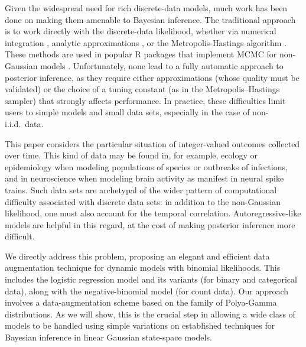 Given the widespread need for rich discrete-data models, much work has been done
on making them amenable to Bayesian inference.  The traditional approach is to
work directly with the discrete-data likelihood, whether via numerical
integration \citep{skene-wakefield-1990}, analytic approximations
\citep{carlin-1992,bradlow-etal-2002,gelman-etal-2008,forster-2011}, or the
Metropolis-Hastings algorithm \citep{dellaportas-forster-1999,
  dobra-tebaldi-west-2006}.  These methods are used in popular R packages that
implement MCMC for non-Gaussian models \citep{mcmcpack-2011}.  Unfortunately,
none lead to a fully automatic approach to posterior inference, as they require
either approximations (whose quality must be validated) or the choice of a
tuning constant (as in the Metropolis--Hastings sampler) that strongly affects
performance.  In practice, these difficulties limit users to simple models and
small data sets, especially in the case of non-i.i.d.~data.

This paper considers the particular situation of integer-valued outcomes
collected over time.  This kind of data may be found in, for example, ecology or
epidemiology when modeling populations of species or outbreaks of infections,
and in neuroscience when modeling brain activity as manifest in neural spike
trains.  Such data sets are archetypal of the wider pattern of computational
difficulty associated with discrete data sets: in addition to the non-Gaussian
likelihood, one must also account for the temporal correlation.
Autoregressive-like models are helpful in this regard, at the cost of making
posterior inference more difficult.

We directly address this problem, proposing an elegant and efficient data
augmentation technique for dynamic models with binomial likelihoods.  This
includes the logistic regression model and its variants (for binary and
categorical data), along with the negative-binomial model (for count data).  Our
approach involves a data-augmentation scheme based on the family of Polya-Gamma
distributions.  As we will show, this is the crucial step in allowing a wide
class of models to be handled using simple variations on established techniques
for Bayesian inference in linear Gaussian state-space models.


